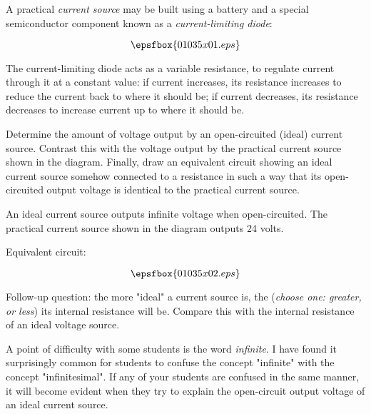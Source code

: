 

A practical {\it current source} may be built using a battery and a special semiconductor component known as a {\it current-limiting diode}:

$$\epsfbox{01035x01.eps}$$

The current-limiting diode acts as a variable resistance, to regulate current through it at a constant value: if current increases, its resistance increases to reduce the current back to where it should be; if current decreases, its resistance decreases to increase current up to where it should be.

\vskip 10pt

Determine the amount of voltage output by an open-circuited (ideal) current source.  Contrast this with the voltage output by the practical current source shown in the diagram.  Finally, draw an equivalent circuit showing an ideal current source somehow connected to a resistance in such a way that its open-circuited output voltage is identical to the practical current source.







An ideal current source outputs infinite voltage when open-circuited.  The practical current source shown in the diagram outputs 24 volts.

\vskip 10pt

Equivalent circuit:

$$\epsfbox{01035x02.eps}$$

\vskip 10pt

Follow-up question: the more "ideal" a current source is, the ({\it choose one: greater, or less}) its internal resistance will be.  Compare this with the internal resistance of an ideal voltage source.







A point of difficulty with some students is the word {\it infinite}.  I have found it surprisingly common for students to confuse the concept "infinite" with the concept "infinitesimal".  If any of your students are confused in the same manner, it will become evident when they try to explain the open-circuit output voltage of an ideal current source.




